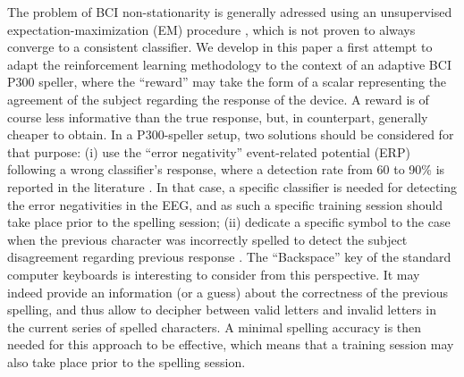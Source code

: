 \documentclass[conference]{IEEEtran}
\begin{document}
The problem of BCI non-stationarity is generally adressed using an unsupervised expectation-maximi\-zation (EM) 
procedure \cite{Li06,Lu09,Kindermans12}, which is not proven to always converge to a consistent classifier.
We develop in this paper a  first attempt to adapt the  
reinforcement learning methodology \cite{Sutton98}
to the context of an adaptive BCI P300 speller,
where the ``reward'' may take the form of a scalar 
representing the agreement of the subject
regarding the response of the device.
A reward is of course less informative than the true response, but, 
in counterpart, generally cheaper to obtain. 
In a P300-speller setup, two solutions should be considered for that purpose: (i)
use the ``error negativity'' event-related potential (ERP) following a wrong classifier's response, where a detection 
rate from 60 to 90\% is reported in the literature \cite{Buttfield06,dalSeno10,Schmidt12}. 
In that case, a specific classifier is needed for detecting the error negativities in the EEG, 
and as such a specific training session should
take place prior to the spelling session; (ii) dedicate a 
specific symbol to the case when the previous character
was incorrectly spelled  to
detect the subject disagreement regarding previous response \cite{Dauce13}. 
The ``Backspace'' key of the standard computer keyboards is interesting to consider 
from this perspective. 
It may indeed provide an information (or a guess) about the correctness of the previous spelling, 
and thus allow to decipher between valid letters and invalid letters in the current series of spelled characters. 
A minimal spelling accuracy 
is then needed for this approach to be effective, which means that a training 
session may also take place prior to the spelling session.
\end{document}
